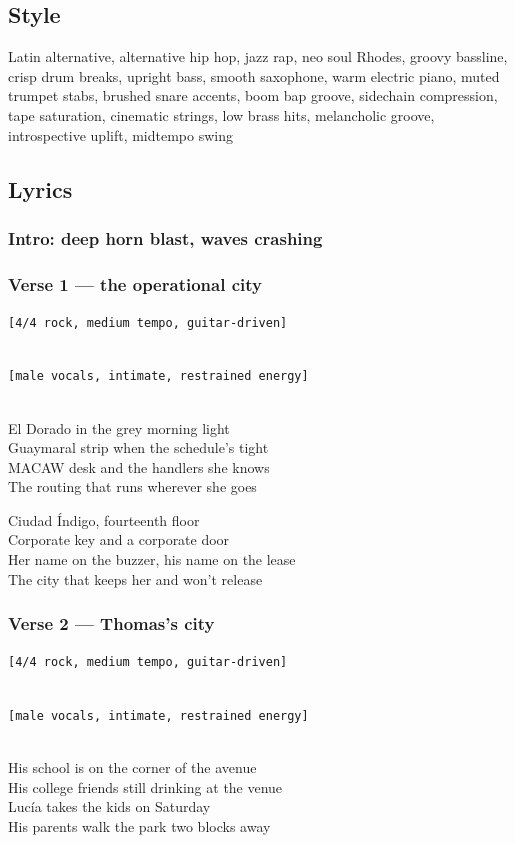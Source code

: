 \subsection{Style}\label{style-36}

Latin alternative, alternative hip hop, jazz rap, neo soul Rhodes,
groovy bassline, crisp drum breaks, upright bass, smooth saxophone, warm
electric piano, muted trumpet stabs, brushed snare accents, boom bap
groove, sidechain compression, tape saturation, cinematic strings, low
brass hits, melancholic groove, introspective uplift, midtempo swing

\subsection{Lyrics}\label{lyrics-36}

\subsubsection{Intro: deep horn blast, waves
crashing}\label{intro-deep-horn-blast-waves-crashing}

\subsubsection{Verse 1 --- the operational
city}\label{verse-1-the-operational-city}

\texttt{{[}4/4\ rock,\ medium\ tempo,\ guitar-driven{]}}\strut \\
\texttt{{[}male\ vocals,\ intimate,\ restrained\ energy{]}}\strut \\
El Dorado in the grey morning light\\
Guaymaral strip when the schedule's tight\\
MACAW desk and the handlers she knows\\
The routing that runs wherever she goes

Ciudad Índigo, fourteenth floor\\
Corporate key and a corporate door\\
Her name on the buzzer, his name on the lease\\
The city that keeps her and won't release

\subsubsection{Verse 2 --- Thomas's city}\label{verse-2-thomass-city}

\texttt{{[}4/4\ rock,\ medium\ tempo,\ guitar-driven{]}}\strut \\
\texttt{{[}male\ vocals,\ intimate,\ restrained\ energy{]}}\strut \\
His school is on the corner of the avenue\\
His college friends still drinking at the venue\\
Lucía takes the kids on Saturday\\
His parents walk the park two blocks away

